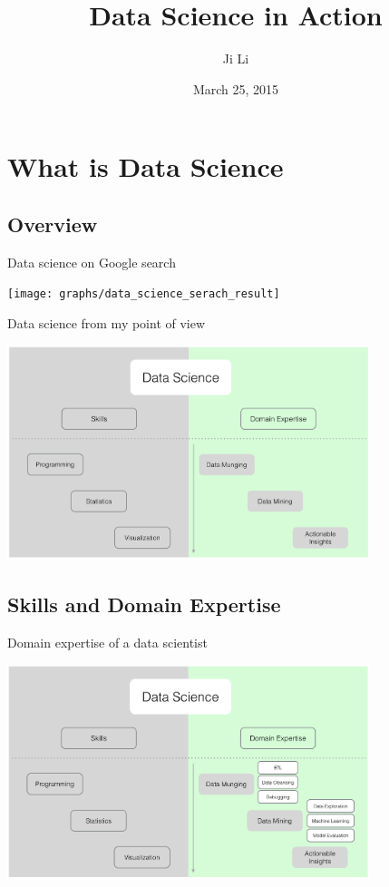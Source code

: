 \documentclass[10pt]{beamer}
\title[Data Science]{Data Science in Action}
\author[JL]{Ji Li}
\institute[DS]{Data Scientist}
\date{March 25, 2015}
\begin{document}
\frame{\titlepage}


\section{What is Data Science}

  \subsection{Overview}

    \begin{frame}{Data science on Google search}
      \begin{center}
        \texttt{[image: graphs/data\_science\_serach\_result]}
      \end{center}
    \end{frame}

    \begin{frame}{Data science from my point of view}
      \begin{center}
        \includegraphics[width=300pt]{graphs/data_science_structure}
      \end{center}
    \end{frame}

  \subsection{Skills and Domain Expertise}
  
    \begin{frame}{Domain expertise of a data scientist}
      \begin{center}
        \includegraphics[width=300pt]{graphs/data_science_domain}
      \end{center}
    \end{frame}
\end{document}
